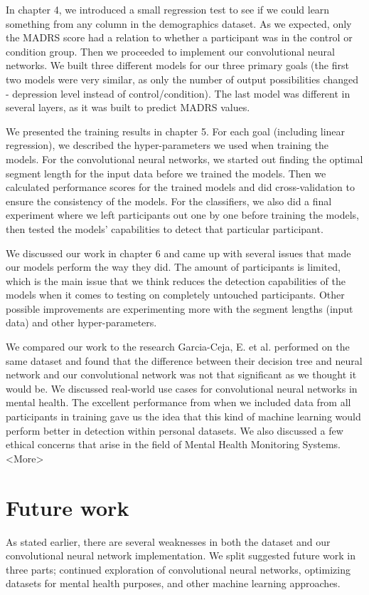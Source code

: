 In chapter 4, we introduced a small regression test to see if we could learn something from any column in the demographics dataset. As we expected, only the MADRS score had a relation to whether a participant was in the control or condition group. Then we proceeded to implement our convolutional neural networks. We built three different models for our three primary goals (the first two models were very similar, as only the number of output possibilities changed - depression level instead of control/condition). The last model was different in several layers, as it was built to predict MADRS values. 

We presented the training results in chapter 5. For each goal (including linear regression), we described the hyper-parameters we used when training the models. For the convolutional neural networks, we started out finding the optimal segment length for the input data before we trained the models. Then we calculated performance scores for the trained models and did cross-validation to ensure the consistency of the models. For the classifiers, we also did a final experiment where we left participants out one by one before training the models, then tested the models' capabilities to detect that particular participant.

We discussed our work in chapter 6 and came up with several issues that made our models perform the way they did. The amount of participants is limited, which is the main issue that we think reduces the detection capabilities of the models when it comes to testing on completely untouched participants. Other possible improvements are experimenting more with the segment lengths (input data) and other hyper-parameters. 

We compared our work to the research Garcia-Ceja, E. et al. performed on the same dataset and found that the difference between their decision tree and neural network and our convolutional network was not that significant as we thought it would be. We discussed real-world use cases for convolutional neural networks in mental health. The excellent performance from when we included data from all participants in training gave us the idea that this kind of machine learning would perform better in detection within personal datasets. We also discussed a few ethical concerns that arise in the field of Mental Health Monitoring Systems. <More>

\section{Future work}
As stated earlier, there are several weaknesses in both the dataset and our convolutional neural network implementation. We split suggested future work in three parts; continued exploration of convolutional neural networks, optimizing datasets for mental health purposes, and other machine learning approaches. 

